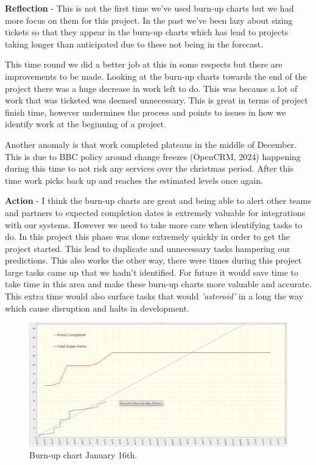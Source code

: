   \vspace{0.2cm}
  \textbf{Reflection} - This is not the first time we've used burn-up charts but we had more focus on them for this project. In the past we've been 
  lazy about sizing tickets so that they appear in the burn-up charts which has lead to projects taking longer than anticipated due to these not 
  being in the forecast.

  This time round we did a better job at this in some respects but there are improvements to be made. Looking at the burn-up charts towards the end of the 
  project there was a huge decrease in work left to do. This was because a lot of work that was ticketed was deemed unnecessary. This is great in terms of 
  project finish time, however undermines the process and points to issues in how we identify work at the beginning of a project.

  Another anomaly is that work completed plateaus in the middle of December. This is due to BBC policy around change freezes (OpenCRM, 2024) happening 
  during this time to not risk any services over the christmas period. After this time work picks back up and reaches the estimated levels once again.

  \vspace{0.2cm}
  \textbf{Action} - I think the burn-up charts are great and being able to alert other teams and partners to expected completion dates is extremely
  valuable for integrations with our systems. However we need to take more care when identifying tasks to do. In this project this phase was done 
  extremely quickly in order to get the project started. This lead to  duplicate and  unnecessary tasks hampering our predictions. This also works the other way, 
  there were times during this project large tasks came up that we hadn't identified. For future it would save time to take time in this area and make these 
  burn-up charts more valuable and accurate. This extra time would also surface tasks that would \textit{'asteroid'} in a long the way which cause disruption 
  and halts in development.

  \begin{figure}[H]
    \centering
    \includegraphics[width=12cm]{assets/outputs/burnups/01-16.png}
    \caption{Burn-up chart January 16th.}
    \label{fig:burnup1}
  \end{figure}

